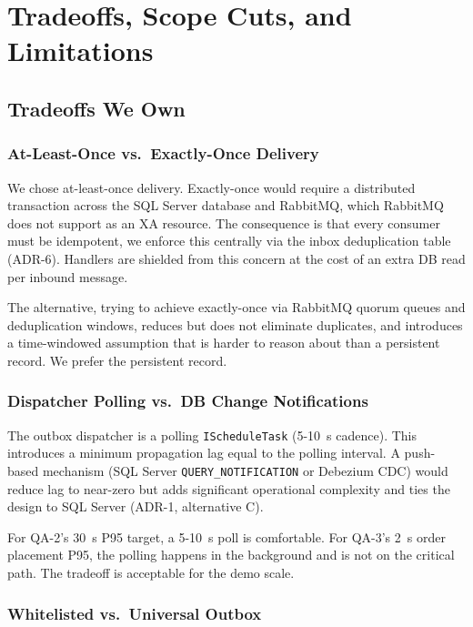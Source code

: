 \chapter{Tradeoffs, Scope Cuts, and Limitations}
\label{ch:tradeoffs}

\section{Tradeoffs We Own}

\subsection{At-Least-Once vs.\ Exactly-Once Delivery}

We chose at-least-once delivery. Exactly-once would require a distributed transaction across the SQL Server database and RabbitMQ, which RabbitMQ does not support as an XA resource. The consequence is that every consumer must be idempotent, we enforce this centrally via the inbox deduplication table (ADR-6). Handlers are shielded from this concern at the cost of an extra DB read per inbound message.

The alternative, trying to achieve exactly-once via RabbitMQ quorum queues and deduplication windows, reduces but does not eliminate duplicates, and introduces a time-windowed assumption that is harder to reason about than a persistent record. We prefer the persistent record.

\subsection{Dispatcher Polling vs.\ DB Change Notifications}

The outbox dispatcher is a polling \texttt{IScheduleTask} (5-10~s cadence). This introduces a minimum propagation lag equal to the polling interval. A push-based mechanism (SQL Server \texttt{QUERY\_NOTIFICATION} or Debezium CDC) would reduce lag to near-zero but adds significant operational complexity and ties the design to SQL Server (ADR-1, alternative C).

For QA-2's 30~s P95 target, a 5-10~s poll is comfortable. For QA-3's 2~s order placement P95, the polling happens in the background and is not on the critical path. The tradeoff is acceptable for the demo scale.

\subsection{Whitelisted vs.\ Universal Outbox}

